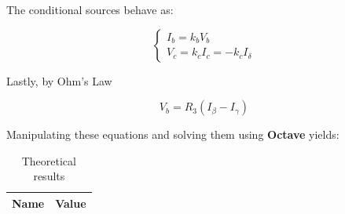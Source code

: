 The conditional sources behave as:

\begin{equation}
  \begin{cases}
  I_b = k_b V_b \\
  V_c = k_c I_c = - k_c I_\delta
  \end{cases}
\end{equation}

Lastly, by Ohm's Law

\begin{equation}
  V_b = R_3 (I_\beta - I_\gamma)
\end{equation}

Manipulating these equations and solving them using {\bf Octave} yields:



\begin{table}[H]
  \centering
  \begin{tabular}{|c|c|}
    \hline
        {\bf Name} & {\bf Value} \footnotemark \\
        \hline
        \hline
        
        \hline
  \end{tabular}
  \caption{Theoretical results}
  \label{mesh_res}
\end{table}


